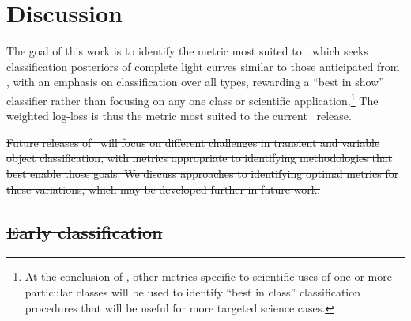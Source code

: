 \section{Discussion}
\label{sec:discussion}

The goal of this work is to identify the metric most suited to \plasticc, which seeks classification posteriors of complete light curves similar to those anticipated from \lsst, with an emphasis on classification over all types, rewarding a ``best in show'' classifier rather than focusing on any one class or scientific application.\footnote{At the conclusion of \plasticc, other metrics specific to scientific uses of one or more particular classes will be used to identify ``best in class'' classification procedures that will be useful for more targeted science cases.}
The weighted log-loss is thus the metric most suited to the current \plasticc\ release.

\sout{Future releases of \plasticc\ will focus on different challenges in transient and variable object classification, with metrics appropriate to identifying methodologies that best enable those goals.
We discuss approaches to identifying optimal metrics for these variations, which may be developed further in future work.}

\subsection{\sout{Early classification} }
\label{sec:early}

